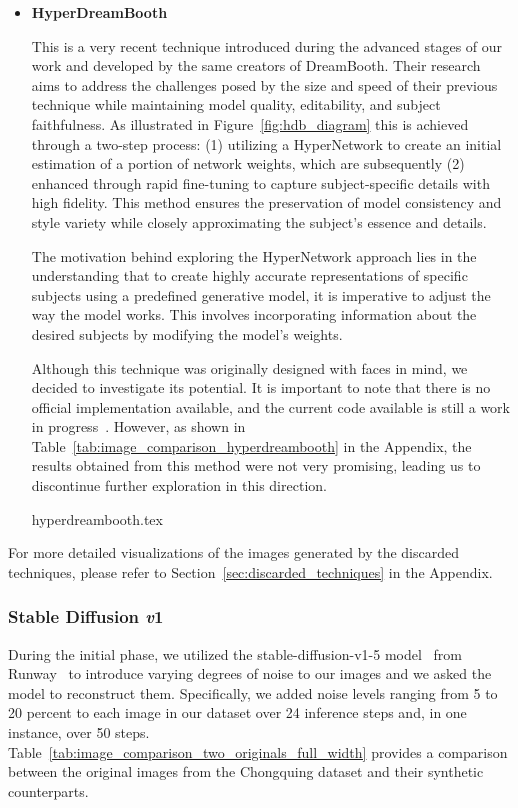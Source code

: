 \begin{itemize}
{perfusion.tex}

    \item \textbf{HyperDreamBooth}~\cite{ruiz2023hyperdreambooth} 
    
This is a very recent technique introduced during the advanced stages of our work and developed by the same creators of DreamBooth. Their research aims to address the challenges posed by the size and speed of their previous technique while maintaining model quality, editability, and subject faithfulness. As illustrated in Figure~\ref{fig:hdb_diagram} this is achieved through a two-step process: (1) utilizing a HyperNetwork to create an initial estimation of a portion of network weights, which are subsequently (2) enhanced through rapid fine-tuning to capture subject-specific details with high fidelity. This method ensures the preservation of model consistency and style variety while closely approximating the subject's essence and details.

The motivation behind exploring the HyperNetwork approach lies in the understanding that to create highly accurate representations of specific subjects using a predefined generative model, it is imperative to adjust the way the model works. This involves incorporating information about the desired subjects by modifying the model's weights.

Although this technique was originally designed with faces in mind, we decided to investigate its potential. It is important to note that there is no official implementation available, and the current code available is still a work in progress~\cite{hyperdreambooth_implementation}. However, as shown in Table~\ref{tab:image_comparison_hyperdreambooth} in the Appendix, the results obtained from this method were not very promising, leading us to discontinue further exploration in this direction.

{hyperdreambooth.tex}        
    
\end{itemize}

For more detailed visualizations of the images generated by the discarded techniques, please refer to Section~\ref{sec:discarded_techniques} in the Appendix.

\subsubsection{Stable Diffusion \textit{v}1}

During the initial phase, we utilized the stable-diffusion-v1-5 model~\cite{Runwaymlstablediffusionv15Hugging} from Runway~\cite{runwayml} to introduce varying degrees of noise to our images and we asked the model to reconstruct them. Specifically, we added noise levels ranging from 5 to 20 percent to each image in our dataset over 24 inference steps and, in one instance, over 50 steps. Table~\ref{tab:image_comparison_two_originals_full_width} provides a comparison between the original images from the Chongquing dataset and their synthetic counterparts. 

